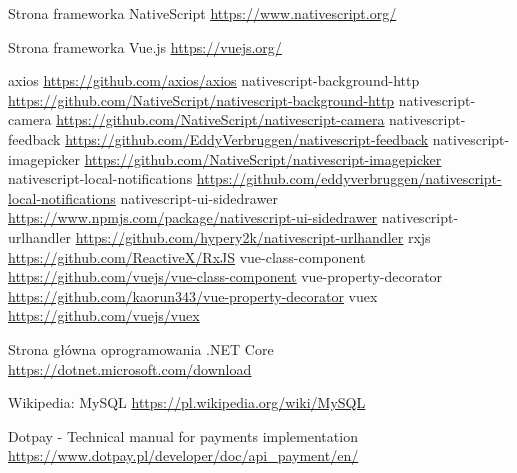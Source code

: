 \documentclass{article}
\begin{document}
\begin{thebibliography}{99}
 Strona frameworka NativeScript \href{https://www.nativescript.org/}{\underline{https://www.nativescript.org/}}

 Strona frameworka Vue.js \href{https://vuejs.org/}{\underline{https://vuejs.org/}}

 axios \href{https://github.com/axios/axios}{\underline{https://github.com/axios/axios}}
 nativescript-background-http \href{https://github.com/NativeScript/nativescript-background-http}{\underline{https://github.com/NativeScript/nativescript-background-http}}
 nativescript-camera \href{https://github.com/NativeScript/nativescript-camera}{\underline{https://github.com/NativeScript/nativescript-camera}}
 nativescript-feedback \href{https://github.com/EddyVerbruggen/nativescript-feedback}{\underline{https://github.com/EddyVerbruggen/nativescript-feedback}}
 nativescript-imagepicker \href{https://github.com/NativeScript/nativescript-imagepicker}{\underline{https://github.com/NativeScript/nativescript-imagepicker}}
 nativescript-local-notifications \href{https://github.com/eddyverbruggen/nativescript-local-notifications}{https://github.com/eddyverbruggen/nativescript-local-notifications}
 nativescript-ui-sidedrawer \href{https://www.npmjs.com/package/nativescript-ui-sidedrawer}{\underline{https://www.npmjs.com/package/nativescript-ui-sidedrawer}}
 nativescript-urlhandler \href{https://github.com/hypery2k/nativescript-urlhandler}{\underline{https://github.com/hypery2k/nativescript-urlhandler}}
 rxjs \href{https://github.com/ReactiveX/RxJS}{\underline{https://github.com/ReactiveX/RxJS}}
 vue-class-component \href{https://github.com/vuejs/vue-class-component}{\underline{https://github.com/vuejs/vue-class-component}}
 vue-property-decorator \href{https://github.com/kaorun343/vue-property-decorator}{\underline{https://github.com/kaorun343/vue-property-decorator}}
 vuex \href{https://github.com/vuejs/vuex}{\underline{https://github.com/vuejs/vuex}}

 Strona główna oprogramowania .NET Core \href{https://dotnet.microsoft.com/download}{\underline{https://dotnet.microsoft.com/download}}

 Wikipedia: MySQL \href{https://pl.wikipedia.org/wiki/MySQL}{\underline{https://pl.wikipedia.org/wiki/MySQL}}

 Dotpay - Technical manual for payments implementation
\href{https://www.dotpay.pl/developer/doc/api_payment/en/}{\underline{https://www.dotpay.pl/developer/doc/api\_payment/en/}}
\end{thebibliography}
\end{document}
